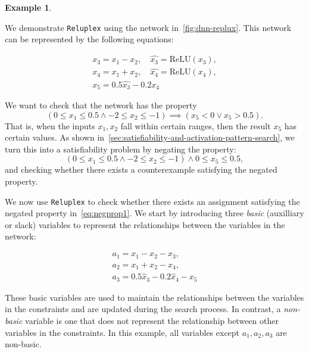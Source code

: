 \documentclass[oneside,11pt,dvipsnames]{book}
\numberwithin{equation}{section}
\theoremstyle{definition}
\newtheorem{example}{Example}[section]
\theoremstyle{remark}
\newcommand{\reluplex}{\texttt{Reluplex}}
\newcommand{\relu}[1]{\mathrm{ReLU}\left(#1\right)}
\begin{document}
\begin{example}\label{ex:reluplex}

  We demonstrate \reluplex{} using the network in~\autoref{fig:dnn-replux}. This network can be represented by the following equations:

\begin{gather*}%
    x_3 = x_1 - x_2,\quad \hat{x_3} = \relu{x_3},\\
    x_4 = x_1 + x_2, \quad \hat{x_4} = \relu{x_4},\\
    x_5 = 0.5\hat{x_3} - 0.2\hat{x_4}
\end{gather*}

We want to check that the network has the property
\begin{equation}\label{eq:prop1}
  (0 \le x_1 \le 0.5 \land -2 \le x_2 \le -1) \implies ( x_5< 0 \lor x_5 > 0.5).
\end{equation}
That is, when the inputs $x_1, x_2$ fall within certain ranges, then the result $x_5$ has certain values.
As shown in~\autoref{sec:satisfiability-and-activation-pattern-search}, we turn this into a satisfiability problem by negating the property:
\begin{equation}\label{eq:negprop1}
    ( 0 \le x_1 \le 0.5 \land -2 \le x_2 \le -1) \land 0 \le x_5 \le 0.5,
  \end{equation}
and checking whether there exists a counterexample satisfying the negated property.



We now use \reluplex{} to check whether there exists an assignment satisfying the negated property in~\autoref{eq:negprop1}.
We start by introducing three \emph{basic} (auxilliary or slack) variables to represent the relationships between the variables in the network:

\begin{gather}
  a_1 = x_1 - x_2 - x_3\label{eq:reluplex2a},\\
  a_2 = x_1 + x_2 - x_4\label{eq:reluplex2b},\\
  a_3 = 0.5\hat{x}_3 -0.2 \hat{x}_4 - x_5\label{eq:reluplex2c}
\end{gather}

These basic variables are used to maintain the relationships between the variables in the constraints and are updated during the search process.
In contrast, a \emph{non-basic} variable is one that does not represent the relationship between other variables in the constraints. In this example, all variables except $a_1, a_2, a_3$ are non-basic.


\end{example}
\end{document}

